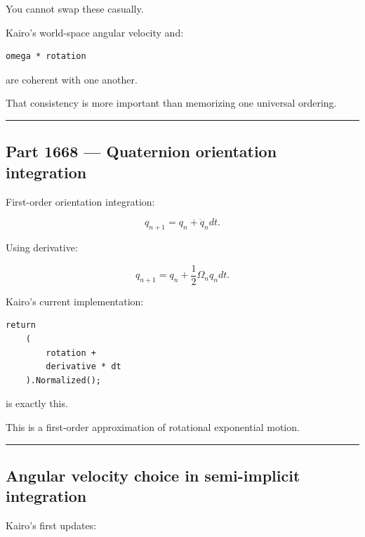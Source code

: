 You cannot swap these casually.

Kairo's world-space angular velocity and:

\begin{verbatim}
omega * rotation
\end{verbatim}

are coherent with one another.

That consistency is more important than memorizing one universal ordering.

\begin{center}\rule{0.5\linewidth}{0.5pt}\end{center}

\subsection{Part 1668 --- Quaternion orientation integration}\label{06-engine-ii-ch037-part-1668-quaternion-orientation-integration}

\hypertarget{06-engine-ii-ch037-part-1668-quaternion-orientation-integration}{}

First-order orientation integration:

\[
q_{n+1}
=
q_n+
\dot q_n dt.
\]

Using derivative:

\[
\boxed{
q_{n+1}
=
q_n+
\frac12
\Omega_n q_n dt.
}
\]

Kairo's current implementation:

\begin{verbatim}
return
    (
        rotation +
        derivative * dt
    ).Normalized();
\end{verbatim}

is exactly this.

This is a first-order approximation of rotational exponential motion.

\begin{center}\rule{0.5\linewidth}{0.5pt}\end{center}

\subsection{Angular velocity choice in semi-implicit integration}\label{06-engine-ii-ch037-angular-velocity-choice-in-semi-implicit-integration}

\hypertarget{06-engine-ii-ch037-angular-velocity-choice-in-semi-implicit-integration}{}

Kairo's  first updates:


